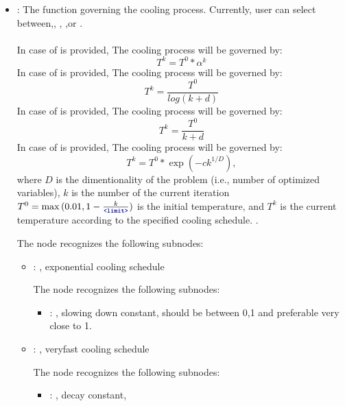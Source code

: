 \begin{itemize}
    \item {}:
      The function governing the cooling process. Currently, user can select
      between,,                  ,
      ,or .\\ \\In case of  is
      provided, The cooling process will be governed by: $$ T^{k} = T^0 * \alpha^k$$
      In case of  is provided, The cooling process will be governed by: $$
      T^{k} = \frac{T^0}{log(k + d)}$$                  In case of  is provided,
      The cooling process will be governed by: $$ T^{k} = \frac{T^0}{k + d}$$In case of
       is provided, The cooling process will be governed by: $$ T^{k} =  T^0 *
      \exp(-ck^{1/D}),$$                  where $D$ is the dimentionality of the problem (i.e.,
      number of optimized variables), $k$ is the number of the current iteration
      $T^{0} = \max{(0.01,1-\frac{k}{\xmlNode{limit}})}$ is the initial temperature, and $T^{k}$ is
      the current temperature                  according to the specified cooling schedule.
      .

      The  node recognizes the following subnodes:
      \begin{itemize}
        \item {}: , 
          exponential cooling schedule

          The  node recognizes the following subnodes:
          \begin{itemize}
            \item {}: , 
              slowing down constant, should be between 0,1 and preferable very close to 1.
          \end{itemize}

        \item {}: , 
          veryfast cooling schedule

          The  node recognizes the following subnodes:
          \begin{itemize}
            \item {}: , 
              decay constant, 
          \end{itemize}


\end{itemize}
\end{itemize}
